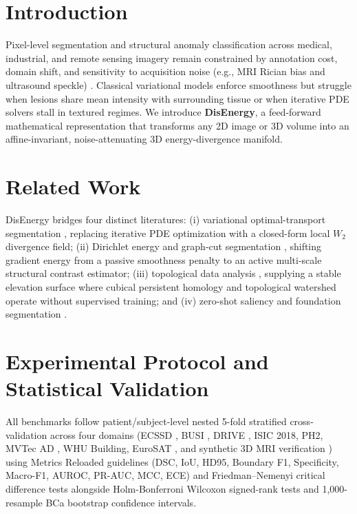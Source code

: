 \documentclass[preprint,12pt]{elsarticle}
\begin{document}
\section{Introduction}
Pixel-level segmentation and structural anomaly classification across medical, industrial, and remote sensing imagery remain constrained by annotation cost, domain shift, and sensitivity to acquisition noise (e.g., MRI Rician bias and ultrasound speckle) \cite{ronneberger2015unet,menze2015brats,bergmann2019mvtec}. Classical variational models \cite{chan2001active,grady2006random} enforce smoothness but struggle when lesions share mean intensity with surrounding tissue or when iterative PDE solvers stall in textured regimes. We introduce \textbf{DisEnergy}, a feed-forward mathematical representation that transforms any 2D image or 3D volume into an affine-invariant, noise-attenuating 3D energy-divergence manifold.

\section{Related Work}
DisEnergy bridges four distinct literatures: (i) variational optimal-transport segmentation \cite{rabin2014adaptive}, replacing iterative PDE optimization with a closed-form local $W_2$ divergence field; (ii) Dirichlet energy and graph-cut segmentation \cite{chan2001active,grady2006random}, shifting gradient energy from a passive smoothness penalty to an active multi-scale structural contrast estimator; (iii) topological data analysis \cite{cohen2007stability,hu2019topology,clough2022topological}, supplying a stable elevation surface where cubical persistent homology and topological watershed operate without supervised training; and (iv) zero-shot saliency and foundation segmentation \cite{yan2013ecssd,kirillov2023sam}.



\section{Experimental Protocol and Statistical Validation}
All benchmarks follow patient/subject-level nested 5-fold stratified cross-validation across four domains (ECSSD \cite{yan2013ecssd}, BUSI \cite{al2020busi}, DRIVE \cite{staal2004drive}, ISIC 2018, PH2, MVTec AD \cite{bergmann2019mvtec}, WHU Building, EuroSAT \cite{helber2019eurosat}, and synthetic 3D MRI verification \cite{menze2015brats}) using Metrics Reloaded guidelines \cite{maier2024metrics} (DSC, IoU, HD95, Boundary F1, Specificity, Macro-F1, AUROC, PR-AUC, MCC, ECE) and Friedman--Nemenyi critical difference tests \cite{demsar2006statistical} alongside Holm-Bonferroni Wilcoxon signed-rank tests and 1,000-resample BCa bootstrap confidence intervals.
\end{document}
